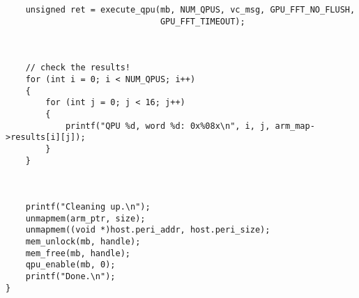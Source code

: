 \begin{lstlisting}
    unsigned ret = execute_qpu(mb, NUM_QPUS, vc_msg, GPU_FFT_NO_FLUSH,
                               GPU_FFT_TIMEOUT);



    // check the results!
    for (int i = 0; i < NUM_QPUS; i++)
    {
        for (int j = 0; j < 16; j++)
        {
            printf("QPU %d, word %d: 0x%08x\n", i, j, arm_map->results[i][j]);
        }
    }



    printf("Cleaning up.\n");
    unmapmem(arm_ptr, size);
    unmapmem((void *)host.peri_addr, host.peri_size);
    mem_unlock(mb, handle);
    mem_free(mb, handle);
    qpu_enable(mb, 0);
    printf("Done.\n");
}

\end{lstlisting}



\section{} %



